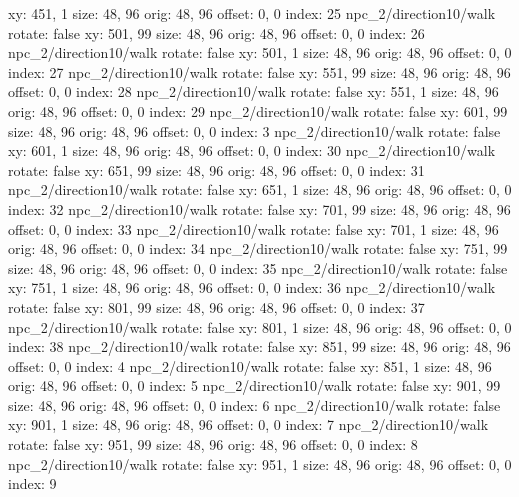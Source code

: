   xy: 451, 1
  size: 48, 96
  orig: 48, 96
  offset: 0, 0
  index: 25
npc_2/direction10/walk
  rotate: false
  xy: 501, 99
  size: 48, 96
  orig: 48, 96
  offset: 0, 0
  index: 26
npc_2/direction10/walk
  rotate: false
  xy: 501, 1
  size: 48, 96
  orig: 48, 96
  offset: 0, 0
  index: 27
npc_2/direction10/walk
  rotate: false
  xy: 551, 99
  size: 48, 96
  orig: 48, 96
  offset: 0, 0
  index: 28
npc_2/direction10/walk
  rotate: false
  xy: 551, 1
  size: 48, 96
  orig: 48, 96
  offset: 0, 0
  index: 29
npc_2/direction10/walk
  rotate: false
  xy: 601, 99
  size: 48, 96
  orig: 48, 96
  offset: 0, 0
  index: 3
npc_2/direction10/walk
  rotate: false
  xy: 601, 1
  size: 48, 96
  orig: 48, 96
  offset: 0, 0
  index: 30
npc_2/direction10/walk
  rotate: false
  xy: 651, 99
  size: 48, 96
  orig: 48, 96
  offset: 0, 0
  index: 31
npc_2/direction10/walk
  rotate: false
  xy: 651, 1
  size: 48, 96
  orig: 48, 96
  offset: 0, 0
  index: 32
npc_2/direction10/walk
  rotate: false
  xy: 701, 99
  size: 48, 96
  orig: 48, 96
  offset: 0, 0
  index: 33
npc_2/direction10/walk
  rotate: false
  xy: 701, 1
  size: 48, 96
  orig: 48, 96
  offset: 0, 0
  index: 34
npc_2/direction10/walk
  rotate: false
  xy: 751, 99
  size: 48, 96
  orig: 48, 96
  offset: 0, 0
  index: 35
npc_2/direction10/walk
  rotate: false
  xy: 751, 1
  size: 48, 96
  orig: 48, 96
  offset: 0, 0
  index: 36
npc_2/direction10/walk
  rotate: false
  xy: 801, 99
  size: 48, 96
  orig: 48, 96
  offset: 0, 0
  index: 37
npc_2/direction10/walk
  rotate: false
  xy: 801, 1
  size: 48, 96
  orig: 48, 96
  offset: 0, 0
  index: 38
npc_2/direction10/walk
  rotate: false
  xy: 851, 99
  size: 48, 96
  orig: 48, 96
  offset: 0, 0
  index: 4
npc_2/direction10/walk
  rotate: false
  xy: 851, 1
  size: 48, 96
  orig: 48, 96
  offset: 0, 0
  index: 5
npc_2/direction10/walk
  rotate: false
  xy: 901, 99
  size: 48, 96
  orig: 48, 96
  offset: 0, 0
  index: 6
npc_2/direction10/walk
  rotate: false
  xy: 901, 1
  size: 48, 96
  orig: 48, 96
  offset: 0, 0
  index: 7
npc_2/direction10/walk
  rotate: false
  xy: 951, 99
  size: 48, 96
  orig: 48, 96
  offset: 0, 0
  index: 8
npc_2/direction10/walk
  rotate: false
  xy: 951, 1
  size: 48, 96
  orig: 48, 96
  offset: 0, 0
  index: 9

